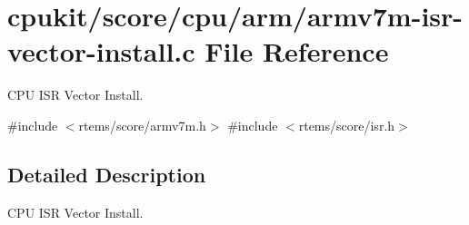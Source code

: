 \hypertarget{armv7m-isr-vector-install_8c}{}\section{cpukit/score/cpu/arm/armv7m-\/isr-\/vector-\/install.c File Reference}
\label{armv7m-isr-vector-install_8c}


C\+PU I\+SR Vector Install.  


{\ttfamily \#include $<$rtems/score/armv7m.\+h$>$}\newline
{\ttfamily \#include $<$rtems/score/isr.\+h$>$}\newline


\subsection{Detailed Description}
C\+PU I\+SR Vector Install. 

